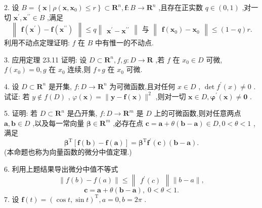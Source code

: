 2. 设 \(B = \left\{  {\mathbf{x} \mid  \rho \left( {\mathbf{x},{\mathbf{x}}_{0}}\right)  \leq  r}\right\}   \subset  {\mathbf{R}}^{n},\mathbf{f} : B \rightarrow  {\mathbf{R}}^{n}\) ,且存在正实数 \(q \in  \left( {0,1}\right)\) ,对一切 \({\mathbf{x}}^{\prime },{\mathbf{x}}^{\prime \prime } \in  B\) ,满足
\[
\begin{Vmatrix}{\mathbf{f}\left( {\mathbf{x}}^{\prime }\right)  - \mathbf{f}\left( {\mathbf{x}}^{\prime \prime }\right) }\end{Vmatrix} \leq  q\begin{Vmatrix}{{\mathbf{x}}^{\prime } - {\mathbf{x}}^{\prime \prime }}\end{Vmatrix}\text{ 与 }\begin{Vmatrix}{\mathbf{f}\left( {\mathbf{x}}_{0}\right)  - {\mathbf{x}}_{0}}\end{Vmatrix} \leq  \left( {1 - q}\right) r.
\]
利用不动点定理证明: \(f\) 在 \(B\) 中有惟一的不动点.

3. 应用定理 23.11 证明: 设 \(D \subset  {\mathbf{R}}^{n},f,g : D \rightarrow  \mathbf{R}\) ,若 \(f\) 在 \({x}_{0} \in  D\) 可微, \(f\left( {x}_{0}\right)  = 0,g\) 在 \({x}_{0}\) 连续,则 \(f \circ  g\) 在 \({x}_{0}\) 可微.

4. 设 \(D \subset  {\mathbf{R}}^{n}\) 是开集, \(f : D \rightarrow  {\mathbf{R}}^{n}\) 为可微函数,且对任何 \(x \in  D\) , \(\det {f}^{\prime }\left( x\right)  \neq  0\) . 试证: 若 \(y \notin  f\left( D\right)\) , \(\varphi \left( \mathbf{x}\right)  = \parallel \mathbf{y} - \mathbf{f}\left( \mathbf{x}\right) {\parallel }^{2}\) ,则对一切 \(\mathbf{x} \in  D,{\mathbf{\varphi }}^{\prime }\left( \mathbf{x}\right)  \neq  \mathbf{0}\) .

5. 证明: 若 \(D \subset  {\mathbf{R}}^{n}\) 是凸开集, \(f : D \rightarrow  {\mathbf{R}}^{m}\) 是 \(D\) 上的可微函数,则对任意两点 \(\mathbf{a},\mathbf{b} \in  D\) ,以及每一常向量 \(\mathbf{\beta } \in  {\mathbf{R}}^{m}\) ,必存在点 \(\mathbf{c} = \mathbf{a} + \theta \left( {\mathbf{b} - \mathbf{a}}\right)  \in  D,0 < \theta  < 1\) ,满足
\[
{\mathbf{\beta }}^{\mathrm{T}}\left\lbrack  {\mathbf{f}\left( \mathbf{b}\right)  - \mathbf{f}\left( \mathbf{a}\right) }\right\rbrack   = {\mathbf{\beta }}^{\mathrm{T}}{\mathbf{f}}^{\prime }\left( \mathbf{c}\right) \left( {\mathbf{b} - \mathbf{a}}\right) .
\]
(本命题也称为向量函数的微分中值定理.)

6. 利用上题结果导出微分中值不等式
\[
\parallel f\left( b\right)  - f\left( a\right) \parallel  \leq  \begin{Vmatrix}{{f}^{\prime }\left( c\right) }\end{Vmatrix}\parallel b - a\parallel ,
\]
\[
\mathbf{c} = \mathbf{a} + \theta \left( {\mathbf{b} - \mathbf{a}}\right) ,\;0 < \theta  < 1.
\]
7. 设 \(\mathbf{f}\left( t\right)  = {\left( \cos t,\sin t\right) }^{\mathrm{T}},a = 0,b = {2\pi }\) .

